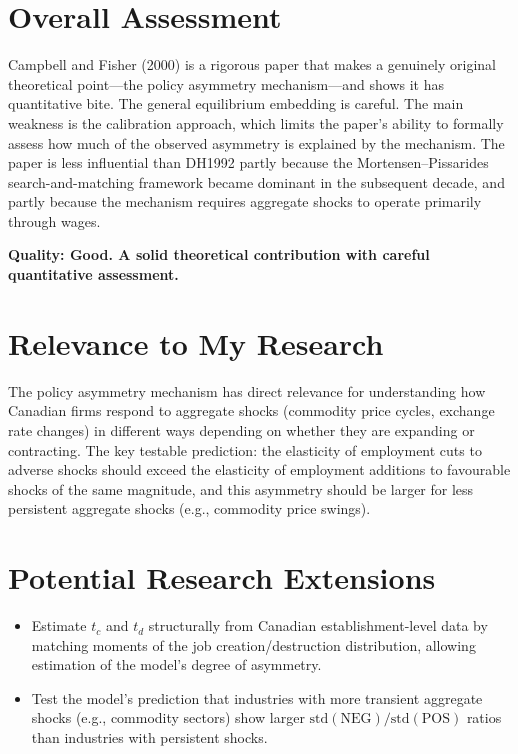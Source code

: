 \section{Overall Assessment}

Campbell and Fisher (2000) is a rigorous paper that makes a genuinely original
theoretical point---the policy asymmetry mechanism---and shows it has
quantitative bite. The general equilibrium embedding is careful. The main
weakness is the calibration approach, which limits the paper's ability to
formally assess how much of the observed asymmetry is explained by the
mechanism. The paper is less influential than DH1992 partly because the
Mortensen--Pissarides search-and-matching framework became dominant in the
subsequent decade, and partly because the mechanism requires aggregate shocks
to operate primarily through wages.

\textbf{Quality: Good. A solid theoretical contribution with careful
quantitative assessment.}

\section{Relevance to My Research}

The policy asymmetry mechanism has direct relevance for understanding how
Canadian firms respond to aggregate shocks (commodity price cycles, exchange
rate changes) in different ways depending on whether they are expanding or
contracting. The key testable prediction: the elasticity of employment cuts to
adverse shocks should exceed the elasticity of employment additions to
favourable shocks of the same magnitude, and this asymmetry should be larger
for less persistent aggregate shocks (e.g., commodity price swings).

\section{Potential Research Extensions}

\begin{itemize}
  \item Estimate $t_c$ and $t_d$ structurally from Canadian establishment-level
    data by matching moments of the job creation/destruction distribution,
    allowing estimation of the model's degree of asymmetry.
  \item Test the model's prediction that industries with more transient aggregate
    shocks (e.g., commodity sectors) show larger $\text{std}(\text{NEG})/
    \text{std}(\text{POS})$ ratios than industries with persistent shocks.
\end{itemize}

